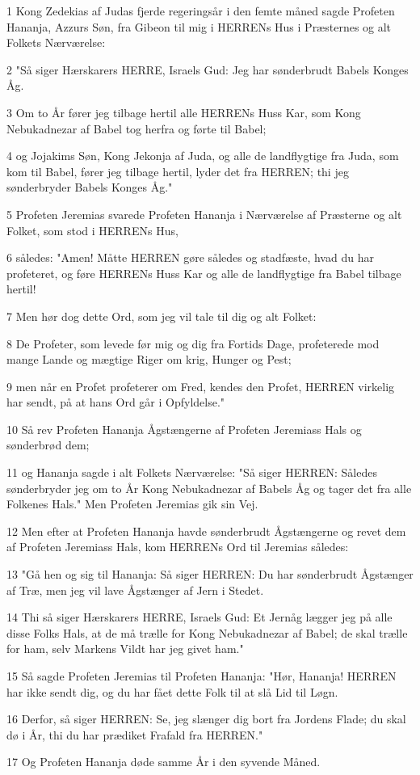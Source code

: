 \par 1 Kong Zedekias af Judas fjerde regeringsår i den femte måned sagde Profeten Hananja, Azzurs Søn, fra Gibeon til mig i HERRENs Hus i Præsternes og alt Folkets Nærværelse:
\par 2 "Så siger Hærskarers HERRE, Israels Gud: Jeg har sønderbrudt Babels Konges Åg.
\par 3 Om to År fører jeg tilbage hertil alle HERRENs Huss Kar, som Kong Nebukadnezar af Babel tog herfra og førte til Babel;
\par 4 og Jojakims Søn, Kong Jekonja af Juda, og alle de landflygtige fra Juda, som kom til Babel, fører jeg tilbage hertil, lyder det fra HERREN; thi jeg sønderbryder Babels Konges Åg."
\par 5 Profeten Jeremias svarede Profeten Hananja i Nærværelse af Præsterne og alt Folket, som stod i HERRENs Hus,
\par 6 således: "Amen! Måtte HERREN gøre således og stadfæste, hvad du har profeteret, og føre HERRENs Huss Kar og alle de landflygtige fra Babel tilbage hertil!
\par 7 Men hør dog dette Ord, som jeg vil tale til dig og alt Folket:
\par 8 De Profeter, som levede før mig og dig fra Fortids Dage, profeterede mod mange Lande og mægtige Riger om krig, Hunger og Pest;
\par 9 men når en Profet profeterer om Fred, kendes den Profet, HERREN virkelig har sendt, på at hans Ord går i Opfyldelse."
\par 10 Så rev Profeten Hananja Ågstængerne af Profeten Jeremiass Hals og sønderbrød dem;
\par 11 og Hananja sagde i alt Folkets Nærværelse: "Så siger HERREN: Således sønderbryder jeg om to År Kong Nebukadnezar af Babels Åg og tager det fra alle Folkenes Hals." Men Profeten Jeremias gik sin Vej.
\par 12 Men efter at Profeten Hananja havde sønderbrudt Ågstængerne og revet dem af Profeten Jeremiass Hals, kom HERRENs Ord til Jeremias således:
\par 13 "Gå hen og sig til Hananja: Så siger HERREN: Du har sønderbrudt Ågstænger af Træ, men jeg vil lave Ågstænger af Jern i Stedet.
\par 14 Thi så siger Hærskarers HERRE, Israels Gud: Et Jernåg lægger jeg på alle disse Folks Hals, at de må trælle for Kong Nebukadnezar af Babel; de skal trælle for ham, selv Markens Vildt har jeg givet ham."
\par 15 Så sagde Profeten Jeremias til Profeten Hananja: "Hør, Hananja! HERREN har ikke sendt dig, og du har fået dette Folk til at slå Lid til Løgn.
\par 16 Derfor, så siger HERREN: Se, jeg slænger dig bort fra Jordens Flade; du skal dø i År, thi du har prædiket Frafald fra HERREN."
\par 17 Og Profeten Hananja døde samme År i den syvende Måned.

